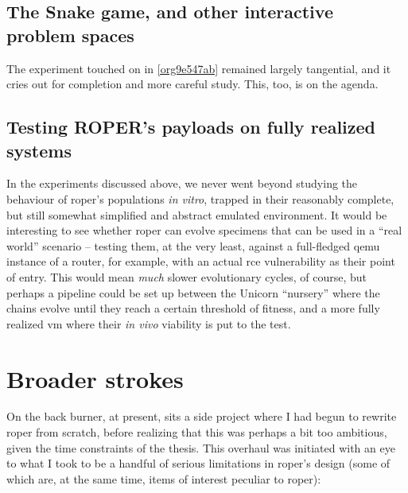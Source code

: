 \documentclass[12pt,glossary]{dalthesis}
\begin{document}
\subsection{The Snake game, and other interactive problem spaces}
\label{sec:org16b4bcf}

The experiment touched on in \ref{org9e547ab} remained largely tangential,
and it cries out for completion and more careful study. This, too, is on the agenda. 

\subsection{Testing ROPER's payloads on fully realized systems}
\label{sec:org060fb99}

In the experiments discussed above, we never went beyond studying the behaviour
of \gls{roper}'s populations \emph{in vitro}, trapped in their reasonably complete, but
still somewhat simplified and abstract emulated environment. It would be interesting
to see whether \gls{roper} can evolve specimens that can be used in a ``real world''
scenario -- testing them, at the very least, against a full-fledged \gls{qemu} instance
of a router, for example, with an actual \gls{rce} vulnerability as their point of
entry. This would mean \emph{much} slower evolutionary cycles, of course, but perhaps
a pipeline could be set up between the Unicorn ``nursery'' where the chains evolve 
until they reach a certain threshold of fitness, and a more fully realized \gls{vm}
where their \emph{in vivo} viability is put to the test. 


\section{Broader strokes}
\label{sec:orgd55ca07}

On the back burner, at present, sits a side project where I had begun to rewrite
\gls{roper} from scratch, before realizing that this was perhaps a bit too
ambitious, given the time constraints of the thesis. This overhaul was initiated
with an eye to what I took to be a handful of serious limitations in \gls{roper}'s
design (some of which are, at the same time, items of interest peculiar to \gls{roper}):
\end{document}
